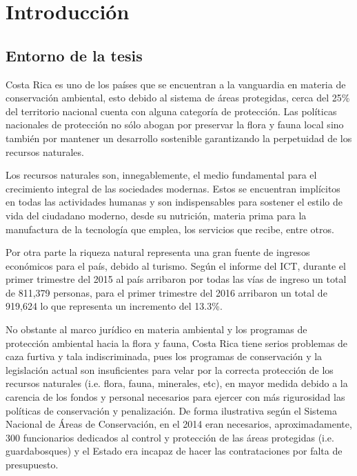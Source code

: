 
\chapter{Introducción}
\label{chp:intro}
\section{Entorno de la tesis}

Costa Rica es uno de los países que se encuentran a la vanguardia en materia de conservación ambiental, esto debido al sistema de áreas protegidas, cerca del 25\% del territorio nacional cuenta con alguna categoría de protección. Las políticas nacionales de protección no sólo abogan por preservar la flora y fauna local sino también por mantener un desarrollo sostenible garantizando la perpetuidad de los recursos naturales. \cite{website:sinac}

Los recursos naturales son, innegablemente, el medio fundamental para el crecimiento integral de las sociedades modernas. Estos se encuentran implícitos en todas las actividades humanas y son indispensables para sostener el estilo de vida del ciudadano moderno, desde su nutrición, materia prima para la manufactura de la tecnología que emplea, los servicios que recibe, entre otros. \cite{website:inbio}

Por otra parte la riqueza natural representa una gran fuente de ingresos económicos para el país, debido al turismo. Según el informe del ICT, durante el primer trimestre del 2015 al país arribaron por todas las vías de ingreso un total de 811,379 personas, para el primer trimestre del 2016 arribaron un total de 919,624 lo que representa un incremento del 13.3\%. \cite{website:ict}

No obstante al marco jurídico en materia ambiental y los programas de protección ambiental hacia la flora y fauna, Costa Rica tiene serios problemas de caza furtiva y tala indiscriminada, pues los programas de conservación y la legislación actual son insuficientes para velar por la correcta protección de los recursos naturales (i.e. flora, fauna, minerales, etc), en mayor medida debido a la carencia de los fondos y personal necesarios para ejercer con más rigurosidad las políticas de conservación y penalización. De forma ilustrativa según el Sistema Nacional de Áreas de Conservación, en el 2014 eran necesarios, aproximadamente, 300 funcionarios dedicados al control y protección de las áreas protegidas (i.e. guardabosques) y el Estado era incapaz de hacer las contrataciones por falta de presupuesto. \cite{website:sinac}

